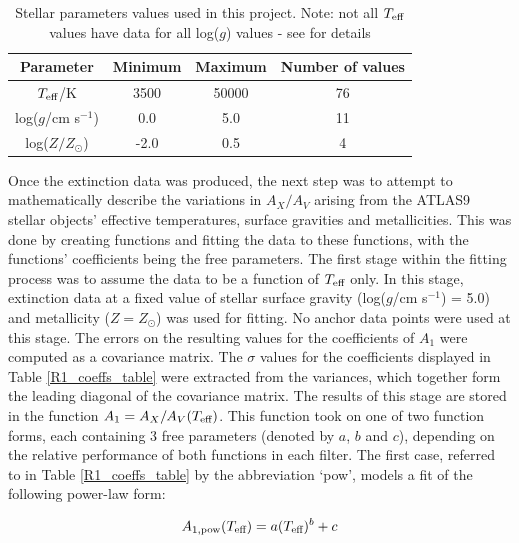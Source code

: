 \documentclass[12pt, a4paper]{report}
\begin{document}
\begin{table}
\begin{center}
\begin{tabular}{cccc}
\hline
Parameter & Minimum & Maximum & Number of values\\
\hline
$T_{\textnormal{eff}}$/K & 3500 & 50000 & 76 \\
log($g$/cm s$^{-1}$) & 0.0 & 5.0 & 11 \\
log($Z/Z_{\odot}$) & -2.0 & 0.5 & 4 \\
\hline

\end{tabular}
\caption{Stellar parameters values used in this project. Note: not all $T_{\textnormal{eff}}$ values have data for all log($g$) values - see \cite{2004astro.ph..5087C} for details}
\label{param_range_table}
\end{center}
\end{table}
Once the extinction data was produced, the next step was to attempt to mathematically describe the variations in $A_{X}/A_{V}$ arising from the ATLAS9 stellar objects' effective temperatures, surface gravities and metallicities. This was done by creating functions and fitting the data to these functions, with the functions' coefficients being the free parameters.
The first stage within the fitting process was to assume the data to be a function of $T_{\textnormal{eff}}$ only. In this stage, extinction data at a fixed value of stellar surface gravity (log($g$/cm s$^{-1}$) = 5.0) and metallicity ($Z = Z_{\odot}$) was used for fitting. No anchor data points were used at this stage. The errors on the resulting values for the coefficients of $A_{1}$ were computed as a covariance matrix. The $\sigma$ values for the coefficients displayed in Table \ref{R1_coeffs_table} were extracted from the variances, which together form the leading diagonal of the covariance matrix. The results of this stage are stored in the function $A_{1} = A_{X}/A_{V}(T_{\textnormal{eff}})$. This function took on one of two function forms, each containing 3 free parameters (denoted by $a$, $b$ and $c$), depending on the relative performance of both functions in each filter. The first case, referred to in Table \ref{R1_coeffs_table} by the abbreviation `pow', models a fit of the following power-law form:

\begin{equation}
A_{1,\textnormal{pow}} (T_{\textnormal{eff}}) = a (T_{\textnormal{eff}})^{b} + c
\label{Teff_pow}
\end{equation}
\end{document}
